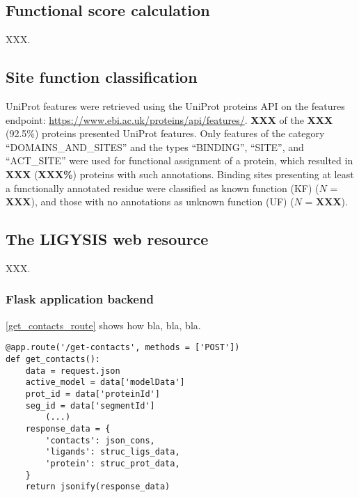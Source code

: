 \subsection{Functional score calculation}

XXX.

\subsection{Site function classification}

UniProt features were retrieved using the UniProt proteins API \cite{NIGHTINGALE_2017_API} on the features endpoint: \url{https://www.ebi.ac.uk/proteins/api/features/}. \textbf{XXX} of the \textbf{XXX} (92.5\%) proteins presented UniProt features. Only features of the category ``DOMAINS\_AND\_SITES'' and the types ``BINDING'', ``SITE'', and ``ACT\_SITE'' were used for functional assignment of a protein, which resulted in \textbf{XXX} (\textbf{XXX\%}) proteins with such annotations. Binding sites presenting at least a functionally annotated residue were classified as known function (KF) ($N$ = \textbf{XXX}), and those with no annotations as unknown function (UF) ($N$ = \textbf{XXX}). 

\subsection{The LIGYSIS web resource}

XXX.

\subsubsection{Flask application backend}

\autoref{get_contacts_route} shows how bla, bla, bla.

\lstset{style=mystyle}

\begin{lstlisting}[language=MyPython, caption={[/get-contacts route]\textbf{/get-contacts route.} This Python code block shows an example of a Flask Web Application route that bla, bla, bla.}, label={get_contacts_route}]
@app.route('/get-contacts', methods = ['POST'])
def get_contacts():
    data = request.json
    active_model = data['modelData']
    prot_id = data['proteinId']
    seg_id = data['segmentId']
		(...)	
    response_data = {
        'contacts': json_cons,
        'ligands': struc_ligs_data,
        'protein': struc_prot_data,
    }
    return jsonify(response_data)
\end{lstlisting}

